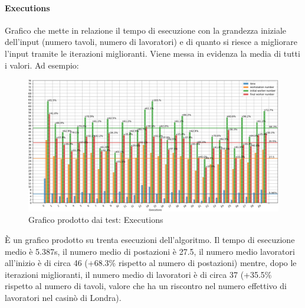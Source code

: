     \paragraph{Executions} Grafico che mette in relazione il tempo di esecuzione con la grandezza iniziale dell’input (numero tavoli, numero di lavoratori) e di quanto si riesce a migliorare l’input tramite le iterazioni miglioranti. Viene messa in evidenza la media di tutti i valori. Ad esempio:
    \begin{figure}[!h]
        \begin{widepage}
            \includegraphics[width=14.9cm,keepaspectratio]{../immagini/executions.png}
            \caption{Grafico prodotto dai test: Executions}
        \end{widepage}
    \end{figure}
    \FloatBarrier
    \noindent
    È un grafico prodotto su trenta esecuzioni dell’algoritmo. Il tempo di esecuzione medio è 5.387s, il numero medio di postazioni è 27.5, il numero medio lavoratori all’inizio è di circa 46 (+68.3\% rispetto al numero di postazioni) mentre, dopo le iterazioni miglioranti, il numero medio di lavoratori è di circa 37 (+35.5\% rispetto al numero di tavoli, valore che ha un riscontro nel numero effettivo di lavoratori nel casinò di Londra).
    
